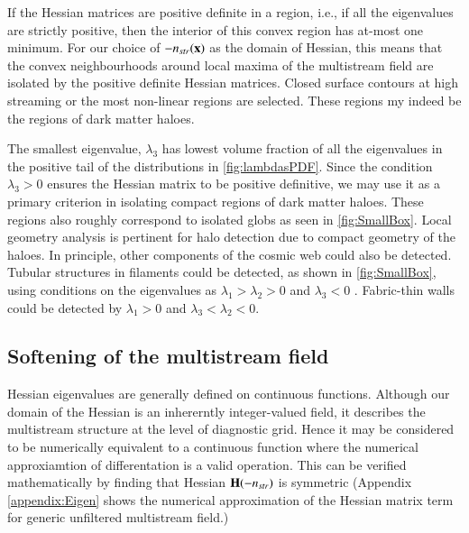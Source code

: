 If the Hessian matrices are positive definite in a region, i.e., if all the eigenvalues are strictly positive, then the interior of this convex region has at-most one minimum. For our choice of $-n_{str}(\bf{x})$ as the domain of Hessian, this means that the convex neighbourhoods around local maxima of the multistream field are isolated by the positive definite Hessian matrices. Closed surface contours at high streaming or the most non-linear regions are selected. These regions my indeed be the regions of dark matter haloes.

The smallest eigenvalue, $\lambda_3$ has lowest volume fraction of all the eigenvalues in the positive tail of the distributions in \autoref{fig:lambdasPDF}. Since the condition $\lambda_3 > 0$ ensures the Hessian matrix to be positive definitive, we may use it as a primary criterion in isolating compact regions of dark matter haloes. These regions also roughly correspond to isolated globs as seen in \autoref{fig:SmallBox}. Local geometry analysis is pertinent for halo detection due to compact geometry of the haloes. In principle, other components of the cosmic web could also be detected. Tubular structures in filaments could be detected, as shown in \autoref{fig:SmallBox}, using conditions on the eigenvalues as $\lambda_1 > \lambda_2 > 0$ and $ \lambda_3 < 0$ . Fabric-thin walls could be detected by $\lambda_1 > 0$ and $ \lambda_3 < \lambda_2 < 0$. 

\subsection{Softening of the multistream field}
\label{sub:Softening}


Hessian eigenvalues are generally defined on continuous functions. Although our domain of the Hessian is an inhererntly integer-valued field, it describes the multistream structure at the level of diagnostic grid. Hence it may be considered to be numerically equivalent to a continuous function where the numerical approxiamtion of differentation is a valid operation. This can be verified mathematically by finding that Hessian ${\bf H}(-n_{str})$ is symmetric (Appendix \ref{appendix:Eigen} shows the numerical approximation of the Hessian matrix term for generic unfiltered multistream field.)

